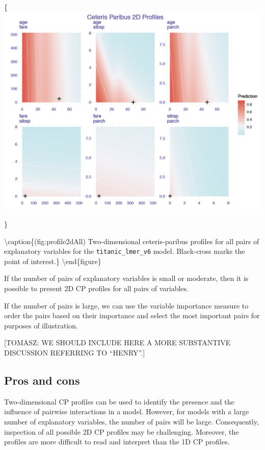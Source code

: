 \documentclass[12pt,]{krantz}
\theoremstyle{definition}
\theoremstyle{definition}
\theoremstyle{definition}
\theoremstyle{remark}
\begin{document}
\{\centering \includegraphics[width=0.9\linewidth]{figure/profile_2d_all}

\}

\textbackslash{}caption\{(fig:profile2dAll) Two-dimensional
ceteris-paribus profiles for all pairs of explanatory variables for the
\texttt{titanic\_lmer\_v6} model. Black-cross marks the point of
interest.\}\label{fig:profile2dAll} \textbackslash{}end\{figure\}

If the number of pairs of explanatory variables is small or moderate,
then it is possible to present 2D CP profiles for all pairs of
variables.

If the number of pairs is large, we can use the variable importance
measure to order the pairs based on their importance and select the most
important pairs for purposes of illustration.

{[}TOMASZ: WE SHOULD INCLUDE HERE A MORE SUBSTANTIVE DISCUSSION
REFERRING TO ``HENRY''.{]}

\hypertarget{ceterisParibus2dProsCons}{%
\subsection{Pros and cons}\label{ceterisParibus2dProsCons}}

Two-dimensional CP profiles can be used to identify the presence and the
influence of pairwise interactions in a model. However, for models with
a large number of explanatory variables, the number of pairs will be
large. Consequently, inspection of all possible 2D CP profiles may be
challenging. Moreover, the profiles are more difficult to read and
interpret than the 1D CP profiles.
\end{document}
